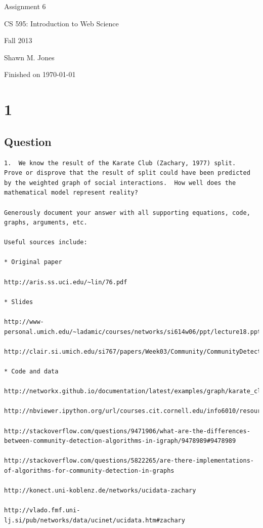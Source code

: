 \documentclass[letterpaper,11pt]{article}
\begin{document}
\begin{titlepage}

\begin{center}

\Huge{Assignment 6}

\Large{CS 595:  Introduction to Web Science}

\Large{Fall 2013}

\Large{Shawn M. Jones}

\Large Finished on \today

\end{center}

\end{titlepage}

\newpage
\section*{1}

\subsection*{Question}

\begingroup
\fontsize{6pt}{10pt}\selectfont
\begin{verbatim}
1.  We know the result of the Karate Club (Zachary, 1977) split.
Prove or disprove that the result of split could have been predicted
by the weighted graph of social interactions.  How well does the
mathematical model represent reality?

Generously document your answer with all supporting equations, code,
graphs, arguments, etc.

Useful sources include:

* Original paper

http://aris.ss.uci.edu/~lin/76.pdf

* Slides

http://www-personal.umich.edu/~ladamic/courses/networks/si614w06/ppt/lecture18.ppt

http://clair.si.umich.edu/si767/papers/Week03/Community/CommunityDetection.pptx

* Code and data

http://networkx.github.io/documentation/latest/examples/graph/karate_club.html

http://nbviewer.ipython.org/url/courses.cit.cornell.edu/info6010/resources/11notes.ipynb

http://stackoverflow.com/questions/9471906/what-are-the-differences-between-community-detection-algorithms-in-igraph/9478989#9478989

http://stackoverflow.com/questions/5822265/are-there-implementations-of-algorithms-for-community-detection-in-graphs

http://konect.uni-koblenz.de/networks/ucidata-zachary

http://vlado.fmf.uni-lj.si/pub/networks/data/ucinet/ucidata.htm#zachary
\end{verbatim}
\endgroup
\end{document}
